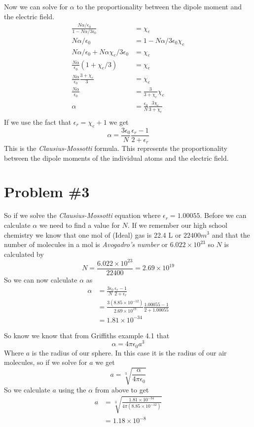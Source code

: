 \documentclass[11pt]{article}
\numberwithin{equation}{section}
\begin{document}
Now we can solve for $\alpha$ to the proportionality between the dipole moment and the electric field.
\begin{align*}
\frac{N\alpha/\epsilon_0}{1-N\alpha/3\epsilon_0} &= \chi_e\\
{N\alpha/\epsilon_0} &= {1-N\alpha/3\epsilon_0}\chi_e\\
{N\alpha/\epsilon_0}+N\alpha\chi_e/3\epsilon_0 &= {\chi_e}\\
\frac{N\alpha}{\epsilon_0}\left(1+\chi_e/3\right) &= {\chi_e}\\
\frac{N\alpha}{\epsilon_0}\frac{3+\chi_e}{3} &= {\chi_e}\\
\frac{N\alpha}{\epsilon_0} &= \frac{3}{3+\chi_e}{\chi_e}\\
\alpha &= \frac{\epsilon_0}{N}\frac{3\chi_e}{3+\chi_e}\\
\end{align*}
If we use the fact that $\epsilon_r = \chi_e+1$ we get
$$\alpha = \frac{3\epsilon_0}{N}\frac{\epsilon_r-1}{2+\epsilon_r}$$
This is the \emph{Clausius-Mossotti} formula. This represents the proportionality between the dipole moments of the individual atoms and the electric field.

\section{Problem \#3}
So if we solve the \emph{Clausius-Mossotti} equation where $\epsilon_r = 1.00055$. Before we can calculate $\alpha$ we need to find a value for $N$. If we remember our high school chemistry we know that one mol of (Ideal) gas is 22.4 L or $22400m^3$ and that the number of molecules in a mol is \emph{Avogadro's number}  or $6.022\times10^{23}$ so $N$ is calculated by
$$N = \frac{6.022\times10^{23}}{22400} = 2.69\times10^{19}$$
So we can now calculate $\alpha$ as
\begin{align*}
\alpha &= \frac{3\epsilon_0}{N}\frac{\epsilon_r-1}{2+\epsilon_r}\\
&= \frac{3(8.85\times10^{-12})}{2.69\times10^{19}}\frac{1.00055-1}{2+1.00055}\\
&= 1.81\times10^{-34}
\end{align*}

So know we know that from Griffiths example 4.1 that
$$\alpha = 4\pi \epsilon_0 a^3$$
Where $a$ is the radius of our sphere. In this case it is the radius of our air molecules, so if we solve for $a$ we get
$$a = \sqrt[3]{\frac{\alpha}{4\pi\epsilon_0}}$$
So we calculate $a$ using the $\alpha$ from above to get
\begin{align*}
a &= \sqrt[3]{\frac{1.81\times10^{-34}}{4\pi(8.85\times10^{-12})}}\\
&= 1.18\times10^{-8}
\end{align*}
\end{document}
